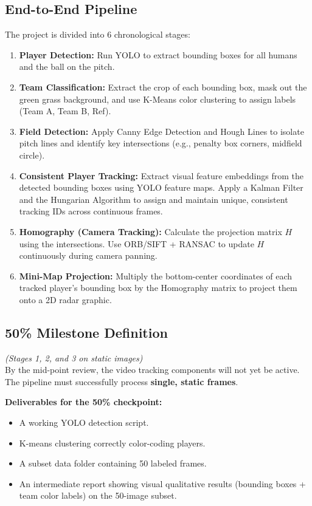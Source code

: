 \documentclass[11pt]{article}
\begin{document}
\subsection{End-to-End Pipeline}
The project is divided into 6 chronological stages:
\begin{enumerate}[leftmargin=*]
    \item \textbf{Player Detection:} Run YOLO to extract bounding boxes for all humans and the ball on the pitch.
    \item \textbf{Team Classification:} Extract the crop of each bounding box, mask out the green grass background, and use K-Means color clustering to assign labels (Team A, Team B, Ref).
    \item \textbf{Field Detection:} Apply Canny Edge Detection and Hough Lines to isolate pitch lines and identify key intersections (e.g., penalty box corners, midfield circle).
    \item \textbf{Consistent Player Tracking:} Extract visual feature embeddings from the detected bounding boxes using YOLO feature maps. Apply a Kalman Filter and the Hungarian Algorithm to assign and maintain unique, consistent tracking IDs across continuous frames.
    \item \textbf{Homography (Camera Tracking):} Calculate the projection matrix $H$ using the intersections. Use ORB/SIFT + RANSAC to update $H$ continuously during camera panning.
    \item \textbf{Mini-Map Projection:} Multiply the bottom-center coordinates of each tracked player's bounding box by the Homography matrix to project them onto a 2D radar graphic.
\end{enumerate}

\subsection{50\% Milestone Definition}
\textit{(Stages 1, 2, and 3 on static images)} \\
By the mid-point review, the video tracking components will not yet be active. The pipeline must successfully process \textbf{single, static frames}. 

\textbf{Deliverables for the 50\% checkpoint:}
\begin{itemize}[leftmargin=*]
    \item A working YOLO detection script.
    \item K-means clustering correctly color-coding players.
    \item A subset data folder containing 50 labeled frames.
    \item An intermediate report showing visual qualitative results (bounding boxes + team color labels) on the 50-image subset.
\end{itemize}
\end{document}
